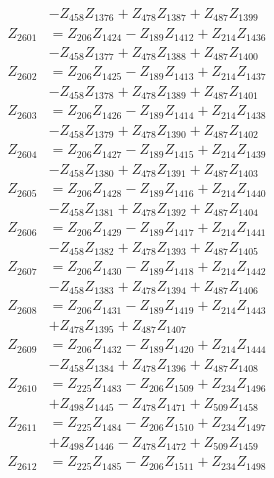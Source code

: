 \begin{multicols}{2}
\begin{align}
&- Z_{458}Z_{1376} + Z_{478}Z_{1387} + Z_{487}Z_{1399} \nonumber \\
Z_{2601} &= Z_{206}Z_{1424} - Z_{189}Z_{1412} + Z_{214}Z_{1436}  \nonumber \\
&- Z_{458}Z_{1377} + Z_{478}Z_{1388} + Z_{487}Z_{1400} \nonumber \\
Z_{2602} &= Z_{206}Z_{1425} - Z_{189}Z_{1413} + Z_{214}Z_{1437}  \nonumber \\
&- Z_{458}Z_{1378} + Z_{478}Z_{1389} + Z_{487}Z_{1401} \nonumber \\
Z_{2603} &= Z_{206}Z_{1426} - Z_{189}Z_{1414} + Z_{214}Z_{1438}  \nonumber \\
&- Z_{458}Z_{1379} + Z_{478}Z_{1390} + Z_{487}Z_{1402} \nonumber \\
Z_{2604} &= Z_{206}Z_{1427} - Z_{189}Z_{1415} + Z_{214}Z_{1439}  \nonumber \\
&- Z_{458}Z_{1380} + Z_{478}Z_{1391} + Z_{487}Z_{1403} \nonumber \\
Z_{2605} &= Z_{206}Z_{1428} - Z_{189}Z_{1416} + Z_{214}Z_{1440}  \nonumber \\
&- Z_{458}Z_{1381} + Z_{478}Z_{1392} + Z_{487}Z_{1404} \nonumber \\
Z_{2606} &= Z_{206}Z_{1429} - Z_{189}Z_{1417} + Z_{214}Z_{1441}  \nonumber \\
&- Z_{458}Z_{1382} + Z_{478}Z_{1393} + Z_{487}Z_{1405} \nonumber \\
Z_{2607} &= Z_{206}Z_{1430} - Z_{189}Z_{1418} + Z_{214}Z_{1442}  \nonumber \\
&- Z_{458}Z_{1383} + Z_{478}Z_{1394} + Z_{487}Z_{1406} \nonumber \\
Z_{2608} &= Z_{206}Z_{1431} - Z_{189}Z_{1419} + Z_{214}Z_{1443}  \nonumber \\
&+ Z_{478}Z_{1395} + Z_{487}Z_{1407} \nonumber \\
Z_{2609} &= Z_{206}Z_{1432} - Z_{189}Z_{1420} + Z_{214}Z_{1444}  \nonumber \\
&- Z_{458}Z_{1384} + Z_{478}Z_{1396} + Z_{487}Z_{1408} \nonumber \\
Z_{2610} &= Z_{225}Z_{1483} - Z_{206}Z_{1509} + Z_{234}Z_{1496}  \nonumber \\
&+ Z_{498}Z_{1445} - Z_{478}Z_{1471} + Z_{509}Z_{1458} \nonumber \\
Z_{2611} &= Z_{225}Z_{1484} - Z_{206}Z_{1510} + Z_{234}Z_{1497}  \nonumber \\
&+ Z_{498}Z_{1446} - Z_{478}Z_{1472} + Z_{509}Z_{1459} \nonumber \\
Z_{2612} &= Z_{225}Z_{1485} - Z_{206}Z_{1511} + Z_{234}Z_{1498}  \nonumber \\

\end{align}
\end{multicols}
